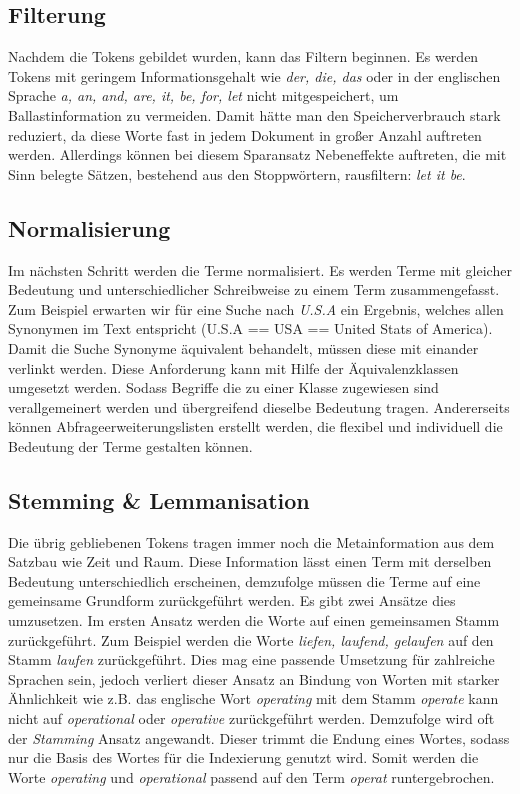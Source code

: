 \subsection[Filterung]{Filterung}

Nachdem die Tokens gebildet wurden, kann das Filtern beginnen. Es werden
Tokens mit geringem Informationsgehalt wie \textit{der, die, das} oder in der
englischen Sprache \textit{a, an, and, are, it, be, for, let} nicht
mitgespeichert, um Ballastinformation zu vermeiden. Damit hätte man den
Speicherverbrauch stark reduziert, da diese Worte fast in jedem
Dokument in großer Anzahl auftreten werden. Allerdings können bei
diesem Sparansatz Nebeneffekte auftreten, die mit Sinn belegte Sätzen,
bestehend aus den Stoppwörtern, rausfiltern: \textit{let it be}. 

\subsection[Normalisierung ]{Normalisierung }
Im nächsten Schritt werden die Terme normalisiert. Es werden Terme mit
gleicher Bedeutung und unterschiedlicher Schreibweise zu einem Term
zusammengefasst. Zum Beispiel erwarten wir für eine Suche nach \textit{U.S.A}
ein Ergebnis, welches allen Synonymen im Text entspricht (U.S.A == USA
== United Stats of America). 
\newline
Damit die Suche Synonyme äquivalent behandelt, müssen diese mit einander
verlinkt werden. Diese Anforderung kann mit Hilfe der Äquivalenzklassen
umgesetzt werden. Sodass Begriffe die zu einer Klasse zugewiesen sind 
verallgemeinert werden und übergreifend dieselbe Bedeutung tragen.
Andererseits können Abfrageerweiterungslisten erstellt werden, die
flexibel und individuell die Bedeutung der Terme gestalten können.


\subsection[Stemming \& Lemmanisation]{Stemming \& Lemmanisation}
Die übrig gebliebenen Tokens tragen immer noch die Metainformation aus
dem Satzbau wie Zeit und Raum. Diese Information lässt einen Term mit
derselben Bedeutung unterschiedlich erscheinen, demzufolge müssen die
Terme auf eine gemeinsame Grundform zurückgeführt werden. 
\bigbreak
Es gibt zwei Ansätze dies umzusetzen. Im ersten Ansatz 
werden die Worte auf einen gemeinsamen Stamm zurückgeführt. Zum
Beispiel werden die Worte \textit{liefen, laufend, gelaufen} auf den Stamm
\textit{laufen} zurückgeführt. Dies mag eine passende Umsetzung für zahlreiche
Sprachen sein, jedoch verliert dieser Ansatz an Bindung von Worten mit
starker Ähnlichkeit wie z.B. das englische Wort \textit{operating} mit dem
Stamm \textit{operate} kann nicht auf \textit{operational} oder \textit{operative}
zurückgeführt werden. Demzufolge wird oft der \textit{Stamming} Ansatz
angewandt. Dieser trimmt die Endung eines Wortes, sodass nur die Basis
des Wortes für die Indexierung genutzt wird. Somit werden die Worte
\textit{operating} und \textit{operational} passend auf den Term \textit{operat}
runtergebrochen.

